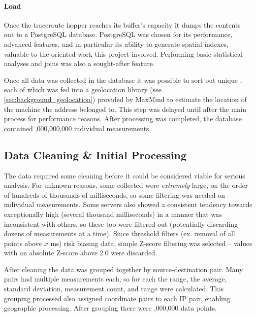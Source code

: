 \paragraph{Load} Once the traceroute hopper reaches its buffer's capacity it dumps the contents out to a PostgreSQL database. PostgreSQL was chosen for its performance, advanced features, and in particular its ability to generate spatial indexes, valuable to the \gis oriented work this project involved. Performing basic statistical analyses and joins was also a sought-after feature.

\bigskip

Once all data was collected in the database it was possible to sort out unique \ips, each of which was fed into a geolocation library (see \autoref{sec:background_geolocation}) provided by MaxMind to estimate the location of the machine the \ip address belonged to. This step was delayed until after the main \etl process for performance reasons. After processing was completed, the database contained ,000,000,000 individual \rtt measurements.

\subsection{Data Cleaning \& Initial Processing}

The data required some cleaning before it could be considered viable for serious analysis. For unknown reasons, some collected \rtts were \textit{extremely} large, on the order of hundreds of thousands of milliseconds, so some filtering was needed on individual measurements. Some servers also showed a consistent tendency towards exceptionally high \rtts (several thousand milliseconds) in a manner that was inconsistent with others, so these too were filtered out (potentially discarding dozens of measurements at a time). Since threshold filters (ex. removal of all points above $x$ ms) risk biasing data, simple Z-score filtering was selected -- values with an absolute Z-score above 2.0 were discarded.

After cleaning the data was grouped together by source-destination \ip pair. Many pairs had multiple measurements each, so for each the range, the average, standard deviation, measurement count, and range were calculated. This grouping processed also assigned coordinate pairs to each IP pair, enabling geographic processing. After grouping there were ,000,000 data points.
